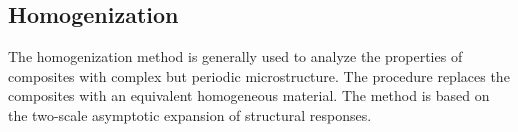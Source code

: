 \documentclass[10pt]{article}
\begin{document}
\subsection{Homogenization}
The homogenization method is generally used to analyze the properties of composites with complex but periodic microstructure. The procedure replaces the composites with an equivalent homogeneous material. 
The method is based on the two-scale asymptotic expansion of structural responses.

\end{document}
